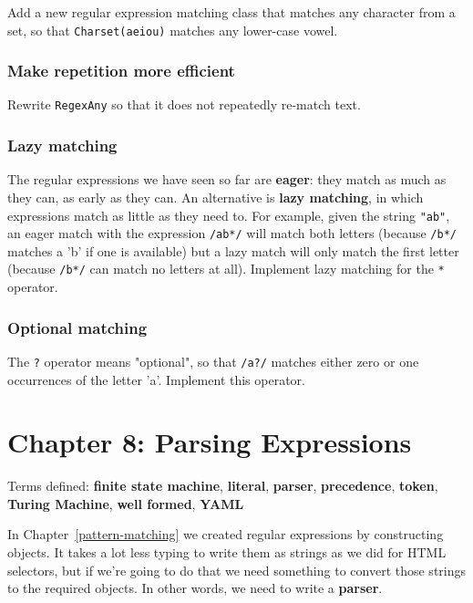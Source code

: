 \documentclass[krantzl]{krantz}
\newcommand{\chapref}[1]{Chapter~\ref{#1}}
\newcommand{\glossref}[1]{\textbf{#1}}
\begin{document}
Add a new regular expression matching class that matches any character from a set,
so that \texttt{Charset({\textquotesingle}aeiou{\textquotesingle})} matches any lower-case vowel.

\subsection*{Make repetition more efficient}


Rewrite \texttt{RegexAny} so that it does not repeatedly re-match text.

\subsection*{Lazy matching}


The regular expressions we have seen so far are \glossref{eager}:
they match as much as they can, as early as they can.
An alternative is \glossref{lazy matching},
in which expressions match as little as they need to.
For example,
given the string \texttt{"ab"},
an eager match with the expression \texttt{/ab*/} will match both letters
(because \texttt{/b*/} matches a 'b' if one is available)
but a lazy match will only match the first letter
(because \texttt{/b*/} can match no letters at all).
Implement lazy matching for the \texttt{*} operator.

\subsection*{Optional matching}


The \texttt{?} operator means "optional",
so that \texttt{/a?/} matches either zero or one occurrences of the letter 'a'.
Implement this operator.

\chapter{Chapter 8: Parsing Expressions}\label{regex-parser}


\noindent 
    Terms defined:
    \glossref{finite state machine}, \glossref{literal}, \glossref{parser}, \glossref{precedence}, \glossref{token}, \glossref{Turing Machine}, \glossref{well formed}, \glossref{YAML}



In \chapref{pattern-matching} we created regular expressions by constructing objects.
It takes a lot less typing to write them as strings as we did for HTML selectors,
but if we're going to do that we need something to convert those strings to the required objects.
In other words, we need to write a \glossref{parser}.
\end{document}
